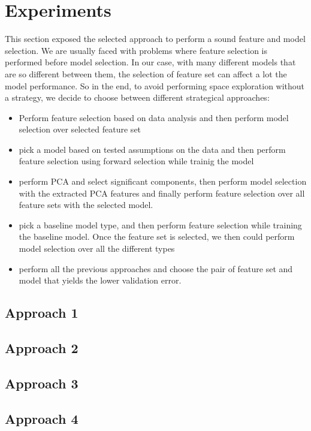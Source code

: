 \section{Experiments}

This section exposed the selected approach to perform a sound feature and model selection. We are usually faced with problems where feature selection is performed before model selection. In our case, with many different models that are so different between them, the selection of feature set can affect a lot the model performance. So in the end, to avoid performing space exploration without a strategy, we decide to choose between different strategical approaches:
\begin{itemize}
    \item Perform feature selection based on data analysis and then perform model selection over selected feature set
    \item pick a model based on tested assumptions on the data and then perform feature selection using forward selection while trainig the model
    \item perform PCA and select significant components, then perform model selection with the extracted PCA features and finally perform feature selection over all feature sets with the selected model.
    \item pick a baseline model type, and then perform feature selection while training the baseline model. Once the feature set is selected, we then could perform model selection over all the different types
    \item perform all the previous approaches and choose the pair of feature set and model that yields the lower validation error.
\end{itemize}

\subsection{Approach 1}

\subsection{Approach 2}

\subsection{Approach 3}

\subsection{Approach 4}

